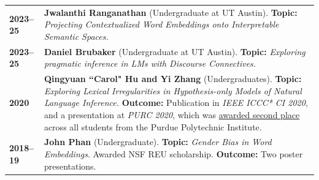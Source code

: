 \documentclass[11pt]{article}
\begin{document}
\begin{longtable}{p{}  p{} }
    \textbf{2023--25} & \textbf{Jwalanthi Ranganathan} (Undergraduate at UT Austin). \textbf{Topic:} \textit{Projecting Contextualized Word Embeddings onto Interpretable Semantic Spaces.}\\
    \textbf{2023--25} & \textbf{Daniel Brubaker} (Undergraduate at UT Austin). \textbf{Topic:} \textit{Exploring pragmatic inference in LMs with Discourse Connectives.}\\
    \textbf{2020} & \textbf{Qingyuan ``Carol" Hu and Yi Zhang} (Undergraduates). \textbf{Topic:} \textit{Exploring Lexical Irregularities in Hypothesis-only Models of Natural Language Inference.} \textbf{Outcome:} Publication in \textit{IEEE ICCC* CI 2020}, and a presentation at \textit{PURC 2020}, which was \underline{awarded second place} across all students from the Purdue Polytechnic Institute.\\
    \textbf{2018--19} & \textbf{John Phan} (Undergraduate). \textbf{Topic:} \textit{Gender Bias in Word Embeddings}. Awarded NSF REU scholarship. \textbf{Outcome:} Two poster presentations.
\end{longtable}
\end{document}
